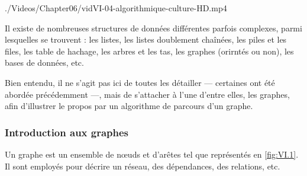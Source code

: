 \begin{marginvideo}
		{./Videos/Chapter06/vidVI-04-algorithmique-culture-HD.mp4}%
\end{marginvideo}

Il existe de nombreuses structures de données différentes parfois complexes, parmi lesquelles se trouvent : les listes, les listes doublement chaînées, les piles et les files, les table de hachage, les arbres et les tas, les graphes (orirntés ou non), les bases de données, etc.

Bien entendu, il ne s'agit pas ici de toutes les détailler --- certaines ont été abordée précédemment ---, mais de s'attacher à l'une d'entre elles, les graphes, afin d'illustrer le propos par un algorithme de parcours d'un graphe.

\subsubsection[Introduction aux graphes]{Introduction aux graphes}
\label{subsub:VI.1.2.1}

Un graphe est un ensemble de nœuds et d'arêtes tel que représentés en \cref{fig:VI.1}. Il sont employés pour décrire un réseau, des dépendances, des relations, etc.

